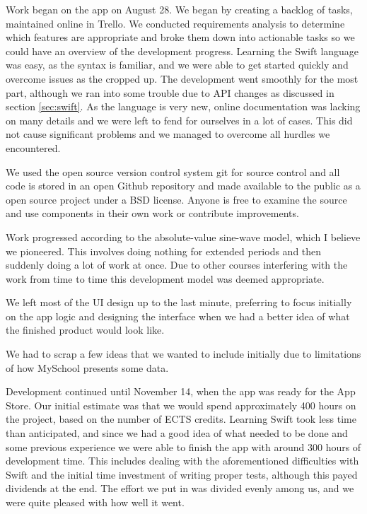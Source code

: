 \documentclass[pdftex, DIV=calc, paper=a4, fontsize=11pt]{scrartcl}	 %
\begin{document}
Work began on the app on August 28. We began by creating a backlog of tasks, maintained online in
Trello\cite{trello}. We conducted requirements analysis to determine which features are appropriate and broke
them down into actionable tasks so we could
have an overview of the development progress. Learning the Swift language was easy, as the syntax
is familiar, and we were able to get started quickly and overcome issues as the cropped up.
The development went smoothly for the most part, although we ran into some trouble due to API changes as discussed in section \ref{sec:swift}.
As the language is very new, online documentation was lacking on many details
and we were left to fend for ourselves in a lot of 
cases. This did not cause significant problems and we managed to overcome all hurdles we encountered.

We used the open source version control system git for source control and all code is stored in an open Github\cite{github} repository and made available
to the public as a open source project under a BSD license\cite{licence}. Anyone is free to examine the source
and use components in their own work or contribute improvements.

Work progressed according to the absolute-value sine-wave model, which I believe we pioneered. This 
involves doing nothing for extended periods and then suddenly doing a lot of work at once. Due to 
other courses interfering with the work from time to time this development model was deemed 
appropriate.

We left most of the UI design up to the last minute, preferring to focus initially on the app logic
and designing the interface when we had a better idea of what the finished product would look like.

We had to scrap a few ideas that we wanted to include initially due to limitations of how MySchool
presents some data.

Development continued until November 14, when the app was ready for the App Store.
Our initial estimate was that we would spend approximately 400 hours on the project, based on the
number of ECTS credits. Learning Swift took less time than anticipated, and since we had a good idea
of what needed to be done and some previous experience we were able to finish the app with around
300 hours of development time. This includes dealing with the aforementioned difficulties with Swift
and the initial time investment of writing proper tests, although this payed dividends at the end.
The effort we put in was divided evenly among us, and we were quite pleased with how well it went.
\end{document}
